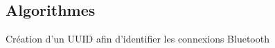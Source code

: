 \documentclass[a4paper,10pt]{report}
\begin{document}
    \subsection{Algorithmes} 
    Création d'un UUID afin d'identifier les connexions Bluetooth
    
    
    
\end{document}
